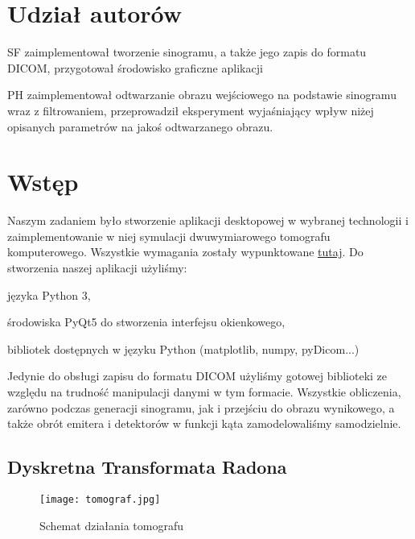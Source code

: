 \documentclass{article}
\begin{document}


\section*{Udział autorów}
\begin{tightlist}
\item SF zaimplementował tworzenie sinogramu, a także jego zapis do formatu DICOM, przygotował środowisko graficzne aplikacji
\item PH zaimplementował odtwarzanie obrazu wejściowego na podstawie sinogramu wraz z filtrowaniem, przeprowadził eksperyment wyjaśniający wpływ niżej opisanych parametrów na jakoś odtwarzanego obrazu.
\end{tightlist}



\section{Wstęp}

Naszym zadaniem było stworzenie aplikacji desktopowej w wybranej technologii i zaimplementowanie w niej symulacji dwuwymiarowego tomografu komputerowego. Wszystkie wymagania zostały wypunktowane \href{https://www.cs.put.poznan.pl/ibladek/students/iwm/0_projekt_wspolny_Tomograf.pdf}{tutaj}. Do stworzenia naszej aplikacji użyliśmy:
\begin{tightlist}
\item języka Python 3,
\item środowiska PyQt5 do stworzenia interfejsu okienkowego,
\item bibliotek dostępnych w języku Python (matplotlib, numpy, pyDicom...)
\end{tightlist}

Jedynie do obsługi zapisu do formatu DICOM użyliśmy gotowej biblioteki ze względu na trudność manipulacji danymi w tym formacie. Wszystkie obliczenia, zarówno podczas generacji sinogramu, jak i przejściu do obrazu wynikowego, a także obrót emitera i detektorów w funkcji kąta zamodelowaliśmy samodzielnie.

\subsection{Dyskretna Transformata Radona}
\begin{figure}[!htbp]
\begin{center}
\texttt{[image: tomograf.jpg]}
\end{center}
\caption{Schemat działania tomografu}
\label{fig:1Tdelta}
\end{figure}
\end{document}
